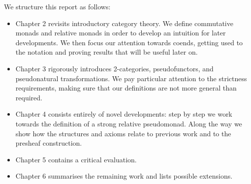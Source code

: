 We structure this report as follows:
\begin{itemize}
  \item Chapter 2 revisits introductory category theory. We define commutative
    monads and relative monads in order to develop an intuition for later
    developments. We then focus our attention towards coends, getting used to
    the notation and proving results that will be useful later on.
  \item Chapter 3 rigorously introduces 2-categories, pseudofunctors, and
    pseudonatural transformations. We pay particular attention to the strictness
    requirements, making sure that our definitions are not more general than required.
  \item Chapter 4 consists entirely of novel developments: step by step we work towards
    the definition of a strong relative pseudomonad. Along the way we show how the
    structures and axioms relate to previous work and to the presheaf construction.
  \item Chapter 5 contains a critical evaluation.
  \item Chapter 6 summarises the remaining work and lists possible extensions.
\end{itemize}



